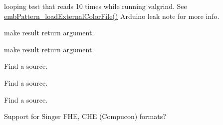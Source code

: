 \begin{DoxyRefList}
\label{todo__todo000010}%
%
looping test that reads 10 times while running valgrind. See \mbox{\hyperlink{embroidery_8h_a3bf191bd99e2da8d36465f454a4646f6}{emb\+Pattern\+\_\+load\+External\+Color\+File()}} Arduino leak note for more info. 
\item[Member \mbox{\hyperlink{vector_8c_a0a4af07bfac410623cf77a35a11550b1}{emb\+Vector\+\_\+multiply}} (Emb\+Vector vector, Emb\+Real magnitude, Emb\+Vector $\ast$result)]\label{todo__todo000240}%
%
make result return argument.  
\item[Member \mbox{\hyperlink{vector_8c_aaad72d90c58592e330de08139aee5077}{emb\+Vector\+\_\+normalize}} (Emb\+Vector vector, Emb\+Vector $\ast$result)]\label{todo__todo000239}%
%
make result return argument.  
\item[File \mbox{\hyperlink{format__art_8c}{format\+\_\+art.c}} ]\label{todo__todo000241}%
%
Find a source.  
\item[File \mbox{\hyperlink{format__bmc_8c}{format\+\_\+bmc.c}} ]\label{todo__todo000242}%
%
Find a source.  
\item[File \mbox{\hyperlink{format__cnd_8c}{format\+\_\+cnd.c}} ]\label{todo__todo000243}%
%
Find a source.  
\item[Page \mbox{\hyperlink{formats}{Formats}} ]\label{todo__todo000200}%
%
Support for Singer FHE, CHE (Compucon) formats?


\end{DoxyRefList}
